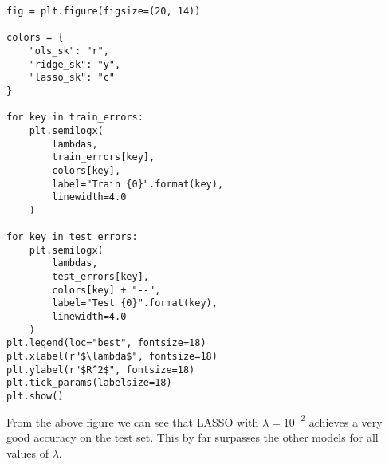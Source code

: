 \documentclass[%
oneside,                 %
final,                   %
10pt]{article}
\begin{document}
\begin{verbatim}
fig = plt.figure(figsize=(20, 14))

colors = {
    "ols_sk": "r",
    "ridge_sk": "y",
    "lasso_sk": "c"
}

for key in train_errors:
    plt.semilogx(
        lambdas,
        train_errors[key],
        colors[key],
        label="Train {0}".format(key),
        linewidth=4.0
    )

for key in test_errors:
    plt.semilogx(
        lambdas,
        test_errors[key],
        colors[key] + "--",
        label="Test {0}".format(key),
        linewidth=4.0
    )
plt.legend(loc="best", fontsize=18)
plt.xlabel(r"$\lambda$", fontsize=18)
plt.ylabel(r"$R^2$", fontsize=18)
plt.tick_params(labelsize=18)
plt.show()
\end{verbatim}

From the above figure we can see that LASSO with $\lambda = 10^{-2}$
achieves a very good accuracy on the test set. This by far surpasses the
other models for all values of $\lambda$.





\end{document}
